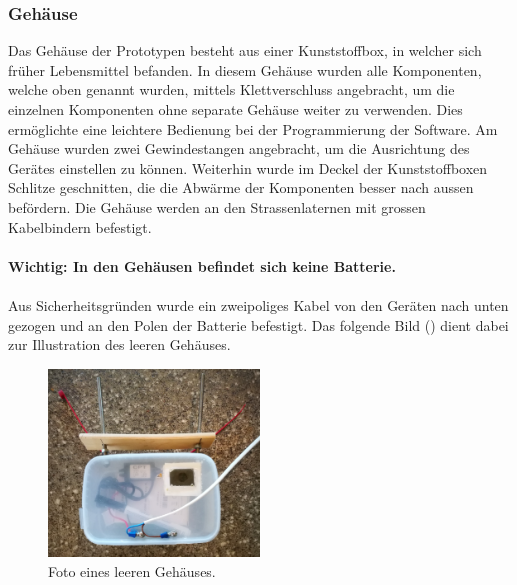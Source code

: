 \subsubsection{Gehäuse}
Das Gehäuse der Prototypen besteht aus einer Kunststoffbox, in welcher sich früher Lebensmittel befanden. In diesem Gehäuse wurden alle Komponenten, welche oben genannt wurden, mittels Klettverschluss angebracht, um die einzelnen Komponenten ohne separate Gehäuse weiter zu verwenden. Dies ermöglichte eine leichtere Bedienung bei der Programmierung der Software. Am Gehäuse wurden zwei Gewindestangen angebracht, um die Ausrichtung des Gerätes einstellen zu können. Weiterhin wurde im Deckel der Kunststoffboxen Schlitze geschnitten, die die Abwärme der Komponenten besser nach aussen befördern. Die Gehäuse werden an den Strassenlaternen mit grossen Kabelbindern befestigt.\\\\
\textbf{Wichtig: In den Gehäusen befindet sich keine Batterie.}\\\\
Aus Sicherheitsgründen wurde ein zweipoliges Kabel von den Geräten nach unten gezogen und an den Polen der Batterie befestigt. Das folgende Bild () dient dabei zur Illustration des leeren Gehäuses.

\begin{figure}[H]
  \centering
  \includegraphics[width=0.5\textwidth]{Hardware/Gehaeuse.jpg} 
  \caption{Foto eines leeren Gehäuses.}
  \label{bGehäuse}
\end{figure}